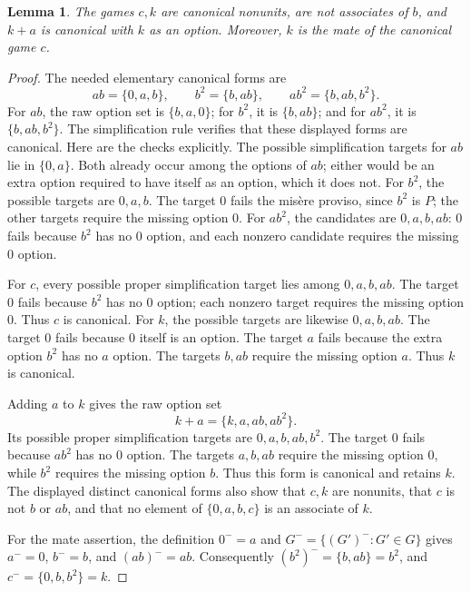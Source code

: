 \documentclass[11pt]{article}
\newtheorem{lemma}[theorem]{Lemma}
\theoremstyle{definition}
\theoremstyle{remark}
\begin{document}
\begin{lemma}\label{lem:grundy-canonical-mate-small}
The games $c,k$ are canonical nonunits, are not associates of $b$, and
$k+a$ is canonical with $k$ as an option.  Moreover, $k$ is the mate of the
canonical game $c$.
\end{lemma}
\begin{proof}
The needed elementary canonical forms are
\[
 ab=\{0,a,b\},\qquad
 b^2=\{b,ab\},\qquad
 ab^2=\{b,ab,b^2\}.
\]
For $ab$, the raw option set is $\{b,a,0\}$; for $b^2$, it is
$\{b,ab\}$; and for $ab^2$, it is $\{b,ab,b^2\}$.  The simplification
rule verifies that these displayed forms are canonical.  Here are the
checks explicitly.  The possible simplification targets for $ab$ lie in
$\{0,a\}$.  Both already occur among the options of $ab$; either would be
an extra option required to have itself as an option, which it does not.
For $b^2$, the possible targets are $0,a,b$.
The target $0$ fails the mis\`ere proviso, since $b^2$ is $P$; the other
targets require the missing option $0$.  For $ab^2$, the candidates are
$0,a,b,ab$: $0$ fails because $b^2$ has no $0$ option, and each nonzero
candidate requires the missing $0$ option.

For $c$, every possible proper simplification target lies among
$0,a,b,ab$.  The target $0$ fails because $b^2$ has no $0$ option; each
nonzero target requires the missing option $0$.  Thus $c$ is canonical.
For $k$, the possible targets are likewise $0,a,b,ab$.  The target $0$
fails because $0$ itself is an option.  The target $a$ fails because the
extra option $b^2$ has no $a$ option.  The targets $b,ab$ require the
missing option $a$.  Thus $k$ is canonical.

Adding $a$ to $k$ gives the raw option set
\[
 k+a=\{k,a,ab,ab^2\}.
\]
Its possible proper simplification targets are $0,a,b,ab,b^2$.
The target $0$ fails because $ab^2$ has no $0$ option.  The targets
$a,b,ab$ require the missing option $0$, while $b^2$ requires the missing
option $b$.  Thus this form is canonical and retains $k$.
The displayed distinct canonical forms also show that $c,k$ are nonunits,
that $c$ is not $b$ or $ab$, and that no element of $\{0,a,b,c\}$ is an
associate of $k$.

For the mate assertion, the definition $0^-=a$ and
$G^-=\{(G')^-:G'\in G\}$ gives $a^-=0$, $b^-=b$, and $(ab)^-=ab$.
Consequently $(b^2)^-=\{b,ab\}=b^2$, and
$c^-=\{0,b,b^2\}=k$.
\end{proof}
\end{document}
